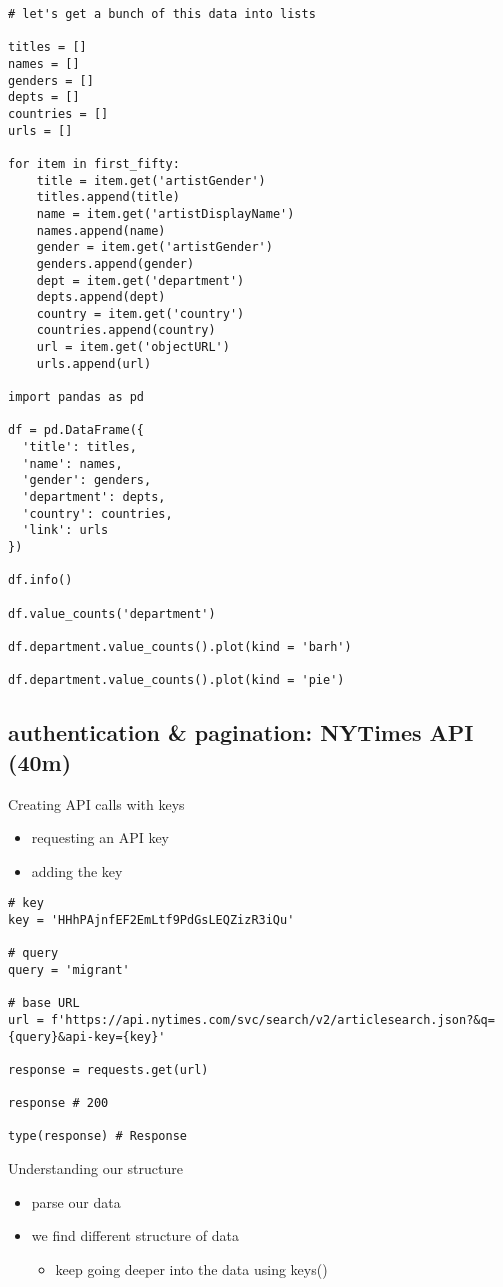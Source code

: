 \documentclass[11pt]{article}
\begin{document}
\begin{verbatim}
# let's get a bunch of this data into lists

titles = []
names = []
genders = []
depts = []
countries = []
urls = []

for item in first_fifty:
    title = item.get('artistGender')
    titles.append(title)
    name = item.get('artistDisplayName')
    names.append(name)
    gender = item.get('artistGender')
    genders.append(gender)
    dept = item.get('department')
    depts.append(dept)
    country = item.get('country')
    countries.append(country)
    url = item.get('objectURL')
    urls.append(url)

import pandas as pd

df = pd.DataFrame({
  'title': titles,
  'name': names,
  'gender': genders,
  'department': depts,
  'country': countries,
  'link': urls
})

df.info()

df.value_counts('department')

df.department.value_counts().plot(kind = 'barh')

df.department.value_counts().plot(kind = 'pie')
\end{verbatim}

\subsection{authentication \& pagination: NYTimes API (40m)}
\label{sec:org1b5f5a7}

Creating API calls with keys
\begin{itemize}
\item requesting an API key
\item adding the key
\end{itemize}

\begin{verbatim}
# key
key = 'HHhPAjnfEF2EmLtf9PdGsLEQZizR3iQu'

# query
query = 'migrant'

# base URL
url = f'https://api.nytimes.com/svc/search/v2/articlesearch.json?&q={query}&api-key={key}'

response = requests.get(url)

response # 200

type(response) # Response

\end{verbatim}

Understanding our structure
\begin{itemize}
\item parse our data
\item we find different structure of data
\begin{itemize}
\item keep going deeper into the data using keys()
\end{itemize}
\end{itemize}
\end{document}
